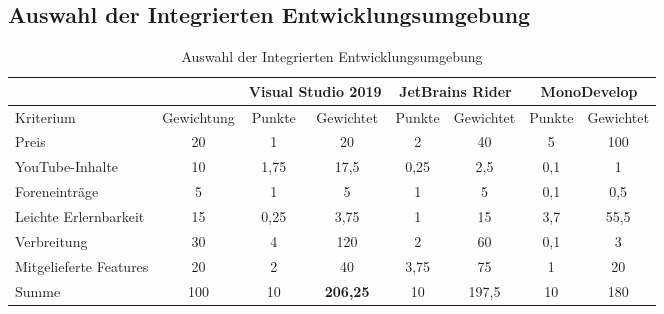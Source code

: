 \documentclass[11pt,toc=sectionentrywithoutdots, 
headheight=44pt, headings=optiontoheadandtoc, hyperfootnotes=false, hypertexnames=false]{scrartcl}
\begin{document}
\subsection{Auswahl der Integrierten Entwicklungsumgebung}
	\label{sec:Auswahl der Integrierten Entwicklungsumgebung}
\begin{center}
\begin{table}[ht]

		\begin{tabular}{|| l | c | c | c | c | c | c | c ||}
	    \hline	
	    
	    \multicolumn{2}{||c|}{} & \multicolumn{2}{|c|}{Visual Studio 2019}  & \multicolumn{2}{|c|}{JetBrains Rider}  & \multicolumn{2}{|c||}{MonoDevelop}   \\
	    \hline
	    Kriterium & Gewichtung & Punkte & Gewichtet  & Punkte & Gewichtet & Punkte & Gewichtet \\
	    \hline
	    Preis & 20 & 1 & 20 & 2 & 40 & 5 & 100 \\
	    YouTube-Inhalte & 10 & 1,75 & 17,5 & 0,25 & 2,5 & 0,1 & 1 \\
	    Foreneinträge & 5 & 1 & 5 & 1 & 5 & 0,1 & 0,5 \\
	    Leichte Erlernbarkeit & 15 & 0,25 & 3,75 & 1 & 15 & 3,7 & 55,5 \\
	    Verbreitung & 30 & 4 & 120 & 2 & 60 & 0,1 & 3 \\
	    Mitgelieferte Features & 20 & 2 & 40 & 3,75 & 75 & 1 & 20 \\
	    \hline
	    Summe & 100 & 10 & \textbf{206,25} & 10 & 197,5 & 10 & 180 \\
	    
		\hline
		
		
	
		
			\end{tabular}
			\caption{Auswahl der Integrierten Entwicklungsumgebung}
			\end{table}
			\end{center}
		\clearpage




 
 

 
 


 
\end{document}
